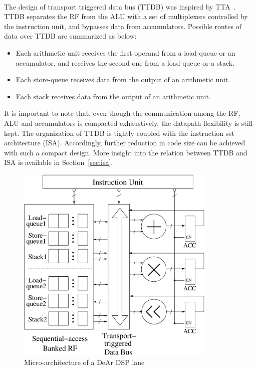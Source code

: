 \\\indent
The design of transport triggered data bus (TTDB) was inspired by TTA~\cite{move}.
TTDB separates the RF from the ALU with a set of multiplexers controlled by the instruction unit, 
and bypasses data from accumulators.
Possible routes of data over TTDB are summarized as below:
\begin{itemize}
    \item Each arithmetic unit receives the first operand from a load-queue or an accumulator, 
        and receives the second one from a load-queue or a stack.
    \item Each store-queue receives data from the output of an arithmetic unit.
    \item Each stack receives data from the output of an arithmetic unit.
\end{itemize}
\indent
It is important to note that, even though the communication among the RF, ALU and accumulators is compacted exhaustively, 
the datapath flexibility is still kept.
The organization of TTDB is tightly coupled with the instruction set architecture (ISA).
Accordingly, further reduction in code size can be achieved with such a compact design.
More insight into the relation between TTDB and ISA is available in Section~\ref{sec:isa}.

\vspace{\textfig}
\begin{figure}[!ht] 
    \centering
    \includegraphics[width=0.85\textwidth]{./figs/micro.eps}
    \caption{Micro-architecture of a DeAr DSP lane}
    \label{fig:micro}
\end{figure}


